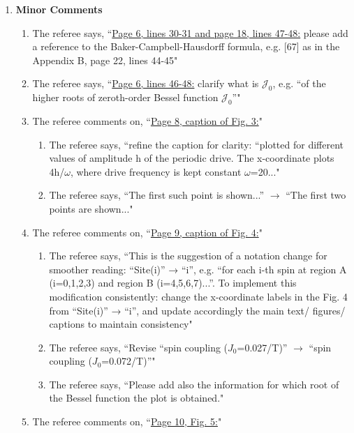 \documentclass[aps,prb,reprint,showpacs,floatfix,superscriptaddress, onecolumn, nofootinbib, 10pt]{revtex4-2}
\newcommand{\comment}[1]{{\color{blue}#1}} %
\begin{document}
\begin{enumerate}
	\item[] {\bf Minor Comments}
	\begin{enumerate}
		\item The referee says, \comment{``\underline{Page 6, lines 30-31 and page 18, lines 47-48:} please add a reference to the Baker-Campbell-Hausdorff formula, e.g. [67] as in the Appendix B, page 22, lines 44-45"}\\
		\item The referee says, \comment{``\underline{Page 6, lines 46-48:} clarify what is $\mathcal{J}_0$, e.g. “of the higher roots of zeroth-order Bessel function $\mathcal{J}_0$”"}\\
		\item The referee comments on, \comment{``\underline{Page 8, caption of Fig. 3:}"}
		\begin{enumerate}
			\item The referee says, \comment{``refine the caption for clarity: “plotted for different values of amplitude h of the periodic drive. The x-coordinate plots 4h/$\omega$, where drive frequency is kept constant $\omega$=20..."}\\
			\item The referee says, \comment{``The first such point is shown...” $\rightarrow$ “The first two points are shown..."}
		\end{enumerate}
		\item The referee comments on, \comment{``\underline{Page 9, caption of Fig. 4:}"}
		\begin{enumerate}
			\item The referee says, \comment{``This is the suggestion of a notation change for smoother reading: “Site(i)” → “i”, 
			e.g. “for each i-th spin at region A (i=0,1,2,3) and region B (i=4,5,6,7)...”. To implement this modification consistently: change the x-coordinate labels in the Fig. 4 from “Site(i)” → “i”, and update accordingly the main text/ figures/ captions to
			maintain consistency"}\\
			\item The referee says, \comment{``Revise “spin coupling ($J_0$=0.027/T)” $\rightarrow$ “spin coupling ($J_0$=0.072/T)”"}
			\item The referee says, \comment{``Please add also the information for which root of the Bessel function the plot is obtained."}
		\end{enumerate}
		\item The referee comments on, \comment{``\underline{Page 10, Fig. 5:}"}
		\begin{enumerate}

\end{enumerate}
\end{enumerate}
\end{enumerate}
\end{document}
